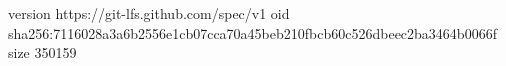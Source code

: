 version https://git-lfs.github.com/spec/v1
oid sha256:7116028a3a6b2556e1cb07cca70a45beb210fbcb60c526dbeec2ba3464b0066f
size 350159
